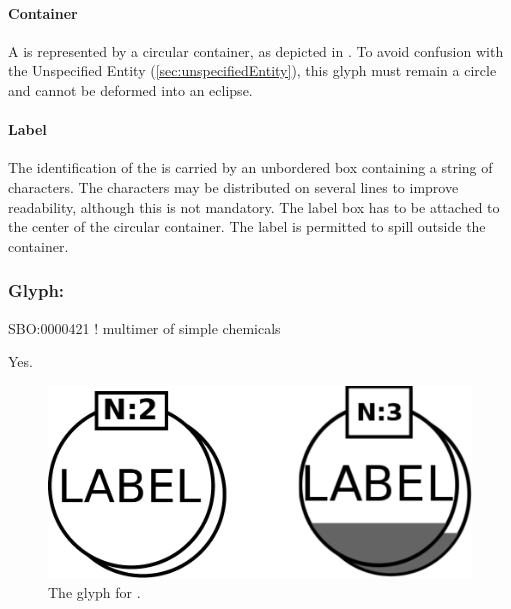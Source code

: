 \paragraph{Container}
A  is represented by a circular
container, as depicted in . To avoid confusion
with the Unspecified Entity (\ref{sec:unspecifiedEntity}), this glyph
must remain a circle and cannot be deformed into an eclipse.

\paragraph{Label}

 The identification of the  is carried by an unbordered box containing a string of characters.  The characters may be distributed on several lines to improve readability, although this is not mandatory.  The label box has to be attached to the center of the circular container.  The label is permitted to spill outside the container.

\subsubsection{Glyph: }

\begin{glyphDescription}
\glyphSboTerm SBO:0000421 ! multimer of simple chemicals
\glyphAux 
\glyphRules%
\begin{inparaenum}
\end{inparaenum}
\glyphCloning Yes.
\end{glyphDescription}


\begin{figure}[htb]
  \centering
  \includegraphics[scale = 0.3]{images/simpleChemicalMultimer}
  \caption{The \PD glyph for .}
  \label{fig:multimer}
\end{figure}

